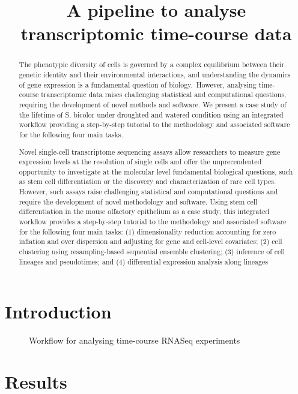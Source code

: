 \documentclass[11 pts]{article}
\begin{document}
\title{A pipeline to analyse transcriptomic time-course data}
\maketitle


\begin{abstract}

The phenotypic diversity of cells is governed by a complex equilibrium between
their genetic identity and their environmental interactions, and understanding
the dynamics of gene expression is a fundamental question of biology. However,
analysing time-course transcriptomic data raises challenging statistical and
computational questions, requiring the development of novel methods and
software. We present a case study of the lifetime of S. bicolor under
droughted and watered condition using an integrated workflow providing a
step-by-step tutorial to the methodology and associated software for the
following four main tasks.

Novel single-cell transcriptome sequencing assays allow researchers to measure
gene expression levels at the resolution of single cells and offer the
unprecendented opportunity to investigate at the molecular level fundamental
biological questions, such as stem cell differentiation or the discovery and
characterization of rare cell types. However, such assays raise challenging
statistical and computational questions and require the development of novel
methodology and software. Using stem cell differentiation in the mouse
olfactory epithelium as a case study, this integrated workflow provides a
step-by-step tutorial to the methodology and associated software for the
following four main tasks: (1) dimensionality reduction accounting for zero
inflation and over dispersion and adjusting for gene and cell-level
covariates; (2) cell clustering using resampling-based sequential ensemble
clustering; (3) inference of cell lineages and pseudotimes; and (4)
differential expression analysis along lineages
\end{abstract}


\section{Introduction}

\begin{figure}
\caption{Workflow for analysing time-course RNASeq experiments}
\end{figure}

\section{Results}
\end{document}
